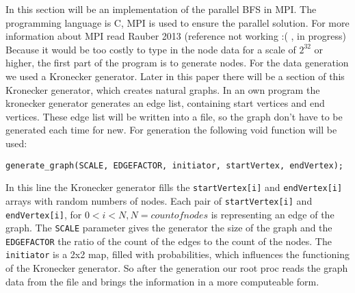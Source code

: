 \documentclass[12pt,a4paper]{article}
\begin{document}
In this section will be an implementation of the parallel BFS in MPI. The programming language is C, MPI is used to ensure the parallel solution. For more information about MPI read Rauber 2013 (reference not working :( , in progress)\\
Because it would be too costly to type in the node data for a scale of \(2^{32}\) or higher, the first part of the program is to generate nodes. For the data generation we used a Kronecker generator. Later in this paper there will be a section of this Kronecker generator, which creates natural graphs. In an own program the kronecker generator generates an edge list, containing start vertices and end vertices. These edge list will be written into a file, so the graph don't have to be generated each time for new. For generation the following void function will be used:

\begin{lstlisting}
generate_graph(SCALE, EDGEFACTOR, initiator, startVertex, endVertex);
\end{lstlisting}

In this line the Kronecker generator fills the \lstinline{startVertex[i]} and \lstinline{endVertex[i]} arrays with random numbers of nodes. Each pair of \lstinline{startVertex[i]} and \lstinline{endVertex[i]}, for \( 0 < i < N, N = count of nodes \) is representing an edge of the graph. The \lstinline{SCALE} parameter gives the generator the size of the graph and the \lstinline{EDGEFACTOR} the ratio of the count of the edges to the count of the nodes. The \lstinline{initiator} is a 2x2 map, filled with probabilities, which influences the functioning of the Kronecker generator. So after the generation our root proc reads the graph data from the file and brings the information in a more computeable form.
\end{document}
